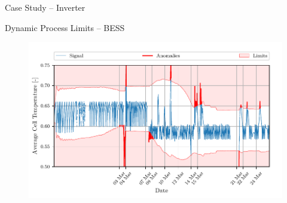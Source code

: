 \documentclass[aspectratio=169]{beamer}
\begin{document}
\begin{frame}{Case Study -- Inverter}
{\begin{figure}[htpb]
\begin{center}
        \end{center}
    \end{figure}
    }
  \end{frame}

\begin{frame}{Dynamic Process Limits -- BESS}
    \begin{figure}[htpb]
        \begin{center}
            \includegraphics[width=0.78\linewidth]{../ilustrate/pc2023/bess/Average_Cell_Temperature_sliding_thresh.pdf}
        \end{center}
    \end{figure}
\end{frame}
\end{document}
